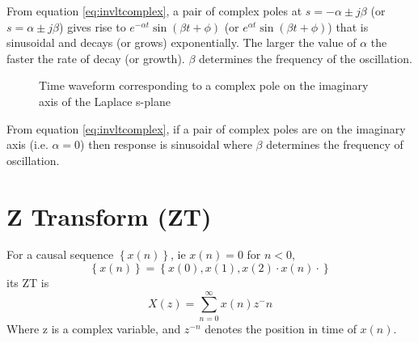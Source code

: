 \documentclass[11pt]{article} %
\theoremstyle{definition}
\begin{document}
	From equation \ref{eq:invltcomplex}, a pair of complex poles at $s=-\alpha \pm j\beta$ (or $s=\alpha \pm j\beta$) gives rise to $e^{-\alpha t}\sin{(\beta t+\phi)}$ (or $e^{\alpha t}\sin{(\beta t+\phi)}$) that is sinusoidal and decays (or grows) exponentially. The larger the value of $\alpha$ the faster the rate of decay (or growth). $\beta$ determines the frequency of the oscillation.

	\begin{figure}[H]
		\centering
		\caption{Time waveform corresponding to a complex pole on the imaginary axis of the Laplace s-plane}
	\end{figure}
	From equation \ref{eq:invltcomplex}, if a pair of complex poles are on the imaginary axis (i.e. $\alpha=0$) then response is sinusoidal where $\beta$ determines the frequency of oscillation.

\section{}
\section{Z Transform (ZT)}
For a causal sequence $\left\{ x(n) \right\}$, ie $x(n)=0$ for $n<0$,
\begin{equation}
\left\{x(n)\right\} = \left\{x(0),x(1), x(2) \cdot x(n)\cdot\right\}
\end{equation}
its ZT is
\begin{equation}
X(z) = \sum^\infty_{n=0}x(n)z^-n
\end{equation}
Where z is a complex variable, and $z^{-n}$ denotes the position in time of $x(n)$.
\end{document}
